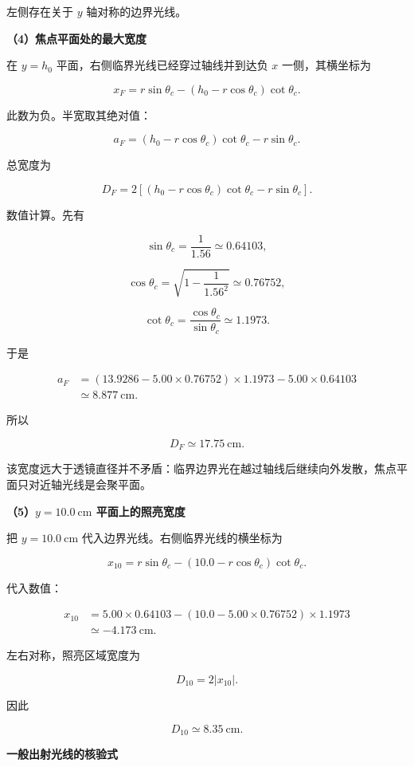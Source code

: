 \documentclass[12pt,a4paper,UTF8]{ctexart}
\begin{document}
左侧存在关于 \(y\) 轴对称的边界光线。

\textbf{（4）焦点平面处的最大宽度}

在 \(y=h_0\) 平面，右侧临界光线已经穿过轴线并到达负 \(x\)
一侧，其横坐标为

\[
x_F=r\sin\theta_c
-(h_0-r\cos\theta_c)\cot\theta_c.
\]

此数为负。半宽取其绝对值：

\[
a_F=(h_0-r\cos\theta_c)\cot\theta_c-r\sin\theta_c.
\]

总宽度为

\[
\boxed{
D_F=2\left[
(h_0-r\cos\theta_c)\cot\theta_c
-r\sin\theta_c
\right]
}.
\]

数值计算。先有

\[
\sin\theta_c=\frac1{1.56}\simeq0.64103,
\]

\[
\cos\theta_c
=\sqrt{1-\frac1{1.56^2}}
\simeq0.76752,
\]

\[
\cot\theta_c
=\frac{\cos\theta_c}{\sin\theta_c}
\simeq1.1973.
\]

于是

\[
\begin{aligned}
a_F
&=(13.9286-5.00\times0.76752)\times1.1973
-5.00\times0.64103\\
&\simeq8.877\ \mathrm{cm}.
\end{aligned}
\]

所以

\[
\boxed{D_F\simeq17.75\ \mathrm{cm}}.
\]

该宽度远大于透镜直径并不矛盾：临界边界光在越过轴线后继续向外发散，焦点平面只对近轴光线是会聚平面。

\textbf{（5）\(y=10.0\ \mathrm{cm}\) 平面上的照亮宽度}

把 \(y=10.0\ \mathrm{cm}\) 代入边界光线。右侧临界光线的横坐标为

\[
x_{10}=r\sin\theta_c
-(10.0-r\cos\theta_c)\cot\theta_c.
\]

代入数值：

\[
\begin{aligned}
x_{10}
&=5.00\times0.64103
-(10.0-5.00\times0.76752)\times1.1973\\
&\simeq-4.173\ \mathrm{cm}.
\end{aligned}
\]

左右对称，照亮区域宽度为

\[
D_{10}=2|x_{10}|.
\]

因此

\[\boxed{D_{10}\simeq8.35\ \mathrm{cm}}.\]

\textbf{一般出射光线的核验式}
\end{document}
